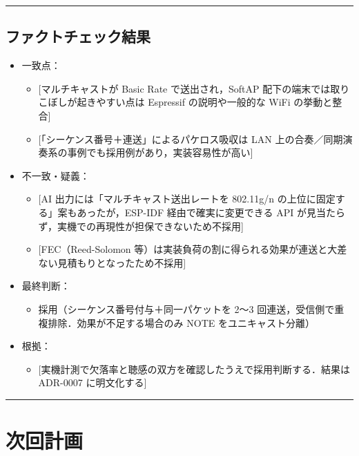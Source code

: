 \documentclass[uplatex,dvipdfmx,a4paper,11pt]{jsarticle}
\newcommand{\sectionrule}{\par\medskip\noindent\rule{\linewidth}{0.6pt}\par\medskip}
\begin{document}
\sectionrule

\subsection{ファクトチェック結果}

\begin{itemize}
  \item 一致点：
    \begin{itemize}
      \item {}[マルチキャストが Basic Rate で送出され，SoftAP 配下の端末では取りこぼしが起きやすい点は Espressif の説明や一般的な WiFi の挙動と整合]
      \item {}[「シーケンス番号＋連送」によるパケロス吸収は LAN 上の合奏／同期演奏系の事例でも採用例があり，実装容易性が高い]
    \end{itemize}
  \item 不一致・疑義：
    \begin{itemize}
      \item {}[AI 出力には「マルチキャスト送出レートを 802.11g/n の上位に固定する」案もあったが，ESP-IDF 経由で確実に変更できる API が見当たらず，実機での再現性が担保できないため不採用]
      \item {}[FEC（Reed-Solomon 等）は実装負荷の割に得られる効果が連送と大差ない見積もりとなったため不採用]
    \end{itemize}
  \item 最終判断：
    \begin{itemize}
      \item 採用（シーケンス番号付与＋同一パケットを 2〜3 回連送，受信側で重複排除．効果が不足する場合のみ NOTE をユニキャスト分離）
    \end{itemize}
  \item 根拠：
    \begin{itemize}
      \item {}[実機計測で欠落率と聴感の双方を確認したうえで採用判断する．結果は ADR-0007 に明文化する]
    \end{itemize}
\end{itemize}

\sectionrule

\section{次回計画}
\end{document}
